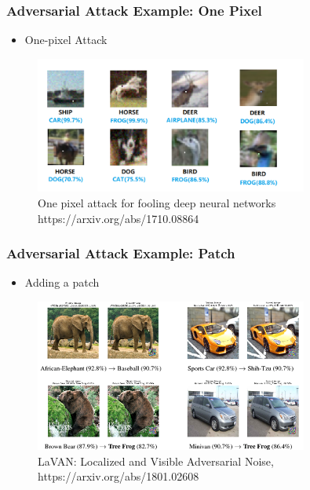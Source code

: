 \documentclass[9pt,dvipsnames]{beamer}
\begin{document}
\begin{frame}
    \frametitle{Adversarial Attack Example: One Pixel}
    \begin{itemize}
        \item One-pixel Attack
    \end{itemize}
    \begin{figure}
    	\centering
    	\includegraphics[width=0.8\textwidth]{imgs/adv_overview_4.png}
    	\caption{One pixel attack for fooling deep neural networks https://arxiv.org/abs/1710.08864}
    \end{figure}
\end{frame}
\begin{frame}
	\frametitle{Adversarial Attack Example: Patch}
	\begin{itemize}
		\item Adding a patch
	\end{itemize}
	    \begin{figure}
		\centering
		\includegraphics[width=0.8\textwidth]{imgs/adv_overview_5.png}
		\caption{LaVAN: Localized and Visible Adversarial Noise, https://arxiv.org/abs/1801.02608}
	\end{figure}
\end{frame}
\end{document}
